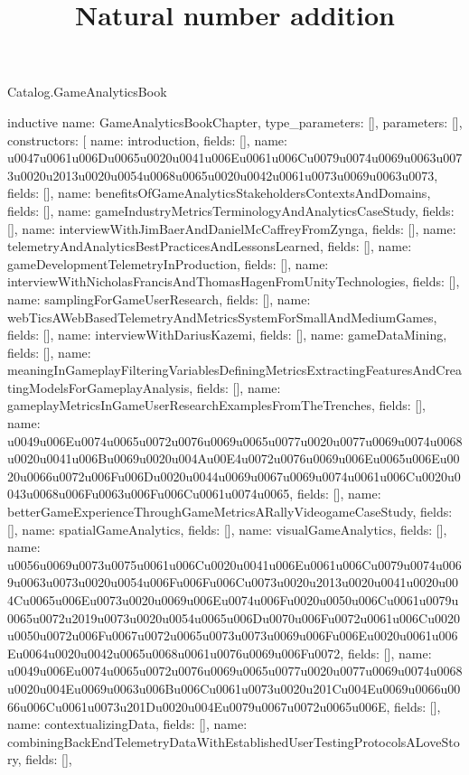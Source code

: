 \begin{lexlean}{Catalog.GameAnalyticsBook}
\title{Natural number addition}
\begin{semanticmodule}
inductive{
  name: GameAnalyticsBookChapter,
  type_parameters: [],
  parameters: [],
  constructors: [
    {name: introduction, fields: []},
    {name: u0047u0061u006Du0065u0020u0041u006Eu0061u006Cu0079u0074u0069u0063u0073u0020u2013u0020u0054u0068u0065u0020u0042u0061u0073u0069u0063u0073, fields: []},
    {name: benefitsOfGameAnalyticsStakeholdersContextsAndDomains, fields: []},
    {name: gameIndustryMetricsTerminologyAndAnalyticsCaseStudy, fields: []},
    {name: interviewWithJimBaerAndDanielMcCaffreyFromZynga, fields: []},
    {name: telemetryAndAnalyticsBestPracticesAndLessonsLearned, fields: []},
    {name: gameDevelopmentTelemetryInProduction, fields: []},
    {name: interviewWithNicholasFrancisAndThomasHagenFromUnityTechnologies, fields: []},
    {name: samplingForGameUserResearch, fields: []},
    {name: webTicsAWebBasedTelemetryAndMetricsSystemForSmallAndMediumGames, fields: []},
    {name: interviewWithDariusKazemi, fields: []},
    {name: gameDataMining, fields: []},
    {name: meaningInGameplayFilteringVariablesDefiningMetricsExtractingFeaturesAndCreatingModelsForGameplayAnalysis, fields: []},
    {name: gameplayMetricsInGameUserResearchExamplesFromTheTrenches, fields: []},
    {name: u0049u006Eu0074u0065u0072u0076u0069u0065u0077u0020u0077u0069u0074u0068u0020u0041u006Bu0069u0020u004Au00E4u0072u0076u0069u006Eu0065u006Eu0020u0066u0072u006Fu006Du0020u0044u0069u0067u0069u0074u0061u006Cu0020u0043u0068u006Fu0063u006Fu006Cu0061u0074u0065, fields: []},
    {name: betterGameExperienceThroughGameMetricsARallyVideogameCaseStudy, fields: []},
    {name: spatialGameAnalytics, fields: []},
    {name: visualGameAnalytics, fields: []},
    {name: u0056u0069u0073u0075u0061u006Cu0020u0041u006Eu0061u006Cu0079u0074u0069u0063u0073u0020u0054u006Fu006Fu006Cu0073u0020u2013u0020u0041u0020u004Cu0065u006Eu0073u0020u0069u006Eu0074u006Fu0020u0050u006Cu0061u0079u0065u0072u2019u0073u0020u0054u0065u006Du0070u006Fu0072u0061u006Cu0020u0050u0072u006Fu0067u0072u0065u0073u0073u0069u006Fu006Eu0020u0061u006Eu0064u0020u0042u0065u0068u0061u0076u0069u006Fu0072, fields: []},
    {name: u0049u006Eu0074u0065u0072u0076u0069u0065u0077u0020u0077u0069u0074u0068u0020u004Eu0069u0063u006Bu006Cu0061u0073u0020u201Cu004Eu0069u0066u0066u006Cu0061u0073u201Du0020u004Eu0079u0067u0072u0065u006E, fields: []},
    {name: contextualizingData, fields: []},
    {name: combiningBackEndTelemetryDataWithEstablishedUserTestingProtocolsALoveStory, fields: []},
}
\end{semanticmodule}
\end{lexlean}
